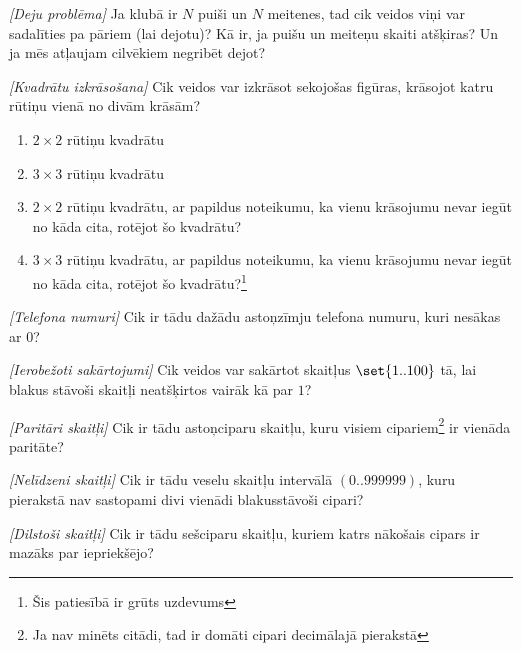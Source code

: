 \begin{problem}
\textit{[Deju problēma]}
Ja klubā ir $N$ puiši un $N$ meitenes, tad cik veidos viņi var sadalīties pa pāriem (lai dejotu)? Kā ir, ja puišu un meiteņu skaiti atšķiras? Un ja mēs atļaujam cilvēkiem negribēt dejot?

\end{problem}
%


\begin{problem}
\textit{[Kvadrātu izkrāsošana]}
Cik veidos var izkrāsot sekojošas figūras, krāsojot katru rūtiņu vienā no divām krāsām?
\begin{enumerate}
\item  $2 \times 2$ rūtiņu kvadrātu
\item  $3 \times 3$ rūtiņu kvadrātu
\item  $2 \times 2$ rūtiņu kvadrātu,  ar papildus noteikumu, ka vienu krāsojumu nevar iegūt no kāda cita, rotējot šo kvadrātu?
\item  $3 \times 3$ rūtiņu kvadrātu,  ar papildus noteikumu, ka vienu krāsojumu nevar iegūt no kāda cita, rotējot šo kvadrātu?\footnote{Šis patiesībā ir grūts uzdevums}
\end{enumerate}
\end{problem}
%

\begin{problem}
\textit{[Telefona numuri]}
Cik ir tādu dažādu astoņzīmju telefona numuru, kuri nesākas ar $0$?
\end{problem}
%

\begin{problem}
\textit{[Ierobežoti sakārtojumi]}
Cik veidos var sakārtot skaitļus $\set{1..100}$ tā, lai blakus stāvoši skaitļi neatšķirtos vairāk kā par $1$?
\end{problem}
%

\begin{problem}
\textit{[Paritāri skaitļi]}
Cik ir tādu astoņciparu skaitļu, kuru visiem cipariem\footnote{Ja nav minēts citādi, tad ir domāti cipari decimālajā pierakstā} ir vienāda paritāte?
\end{problem}
%

\begin{problem}
\textit{[Nelīdzeni skaitļi]}
Cik ir tādu veselu skaitļu intervālā $(0..999999)$, kuru pierakstā nav sastopami divi vienādi blakusstāvoši cipari?
\end{problem}
%

\begin{problem}
\textit{[Dilstoši skaitļi]}
Cik ir tādu sešciparu skaitļu, kuriem katrs nākošais cipars ir mazāks par iepriekšējo?
\end{problem}
%


